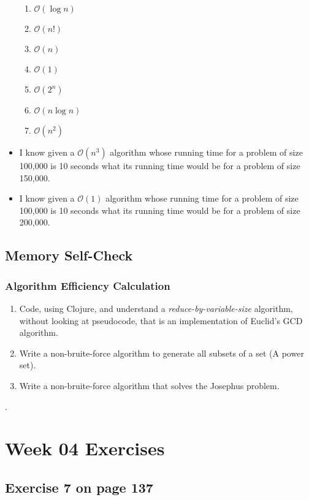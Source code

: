 \documentclass[12pt]{amsart}
\begin{document}
\begin{itemize}
    \begin{enumerate}
    \item $\mathcal{O}(\log n)$
    \item  $\mathcal{O}(n!)$
    \item  $\mathcal{O}(n)$
    \item  $\mathcal{O}(1)$
    \item  $\mathcal{O}(2^n)$
    \item  $\mathcal{O}(n \log n)$
    \item  $\mathcal{O}(n^2)$
   \end{enumerate}
\item  I know given a $\mathcal{O}(n^3)$ algorithm whose running time for a problem of size 100,000 is 10 seconds what its running time would be for a problem of size 150,000.
\item  I know given a $\mathcal{O}(1)$ algorithm whose running time for a problem of size 100,000 is 10 seconds what its running time would be for a problem of size 200,000.

\end{itemize}
\subsection{Memory Self-Check}

\subsubsection{Algorithm Efficiency Calculation}


\begin{enumerate}
     \item Code, using Clojure, and understand a \textit{reduce-by-variable-size} algorithm, without looking at pseudocode, that is an implementation of Euclid's GCD algorithm.
     \item Write a non-bruite-force algorithm to generate all subsets of a set (A power set).
     \item Write a non-bruite-force algorithm that solves the Josephus problem.
\end{enumerate}.



\section{Week 04 Exercises}
\subsection{ Exercise 7 on page 137} 
\end{document}
